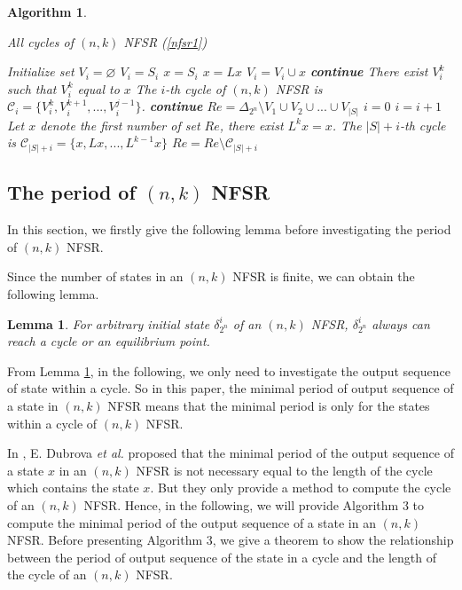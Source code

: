 \documentclass[conference]{IEEEtran}
\newtheorem{lemma}{Lemma}
\newtheorem{algorithm}{Algorithm}
\begin{document}
\begin{algorithm}\label{al1}
\caption{All cycles of $(n,k)$ NFSR (\ref{nfsr1})}
\begin{algorithmic}[1]
\STATE Initialize set $V_i=\varnothing$
\STATE $V_i=S_i$
\STATE $x=S_i$
\STATE  $x=Lx$
\STATE $V_i=V_i\cup x$
\STATE \textbf{continue}
\ENDIF
\ELSE
\STATE There exist $V^k_i$ such that $V^k_i$ equal to $x$
\STATE The $i$-th cycle of $(n,k)$ NFSR is $\mathcal{C}_i=\{V^k_i,V^{k+1}_i,...,V^{j-1}_i\}$.
\STATE \textbf{continue}
\ENDIF
\ENDFOR
\ENDFOR
\STATE $Re=\Delta_{2^n} \setminus V_1\cup V_2\cup...\cup V_{|S|}$
\STATE $i=0$
\STATE $i=i+1$
\STATE Let $x$ denote the first number of set $Re$, there exist $L^k x=x$.
\STATE The $|S|+i$-th cycle is $\mathcal{C}_{|S|+i}=\{x,Lx,...,L^{k-1}x\}$
\STATE $Re=Re\setminus \mathcal{C}_{|S|+i}$
\ENDWHILE
\end{algorithmic}
\end{algorithm}

\subsection{The period of $(n,k)$ NFSR}
In this section, we firstly give the following lemma before investigating the period of $(n,k)$ NFSR.

Since the number of states in an $(n,k)$ NFSR is finite, we can obtain the following lemma.
\begin{lemma}\label{lemma2}
For arbitrary initial state $\delta^i_{2^n}$ of an $(n,k)$ NFSR, $\delta^i_{2^n}$ always can reach a cycle or an equilibrium point.
\end{lemma}

From Lemma \ref{lemma2}, in the following, we only need to investigate the output sequence of state within a cycle. So in this paper, the minimal period of output sequence of a state in $(n,k)$ NFSR means that the minimal period is only for the states within a cycle of $(n,k)$ NFSR.

In \cite{Dubrova2008On}, E. Dubrova \textit{et al.} proposed that the minimal period of the output sequence of a state $x$ in an $(n,k)$ NFSR is not necessary equal to the length of the cycle which contains the state $x$. But they only provide a method to compute the cycle of an $(n,k)$ NFSR. Hence, in the following, we will provide Algorithm 3 to compute the minimal period of the output sequence of a state in an $(n,k)$ NFSR. Before presenting Algorithm 3, we give a theorem to show the relationship between the period of output sequence of the state in a cycle and the length of the cycle of an $(n,k)$ NFSR.
\end{document}

